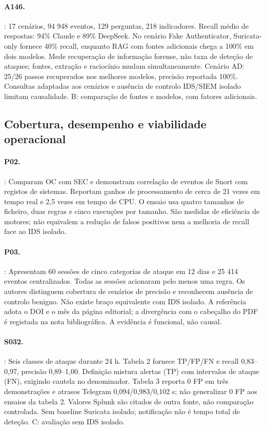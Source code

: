 \documentclass[11pt,a4paper]{article}
\begin{document}
\paragraph{A146.} \citet{ragincident2026}: 17 cenários, 94 948 eventos, 129 perguntas, 218 indicadores. Recall médio de respostas: 94\% Claude e 89\% DeepSeek. No cenário Fake Authenticator, Suricata-only fornece 40\% recall, enquanto RAG com fontes adicionais chega a 100\% em dois modelos. Mede recuperação de informação forense, não taxa de deteção de ataques; fontes, extração e raciocínio mudam simultaneamente. Cenário AD: 25/26 passos recuperados nos melhores modelos, precisão reportada 100\%. Consultas adaptadas aos cenários e ausência de controlo IDS/SIEM isolado limitam causalidade. B: comparação de fontes e modelos, com fatores adicionais.

\subsection{Cobertura, desempenho e viabilidade operacional}
\paragraph{P02.} \citet{sheeraz2024}: Comparam OC com SEC e demonstram correlação de eventos de Snort com registos de sistemas. Reportam ganhos de processamento de cerca de 21 vezes em tempo real e 2,5 vezes em tempo de CPU. O ensaio usa quatro tamanhos de ficheiro, duas regras e cinco execuções por tamanho. São medidas de eficiência de motores; não equivalem a redução de falsos positivos nem a melhoria de recall face ao IDS isolado.

\paragraph{P03.} \citet{suryayusra2026}: Apresentam 60 sessões de cinco categorias de ataque em 12 dias e 25 414 eventos centralizados. Todas as sessões acionaram pelo menos uma regra. Os autores distinguem cobertura de cenários de precisão e reconhecem ausência de controlo benigno. Não existe braço equivalente com IDS isolado. A referência adota o DOI e o mês da página editorial; a divergência com o cabeçalho do PDF é registada na nota bibliográfica. A evidência é funcional, não causal.

\paragraph{S032.} \citet{wazuhtelegram2026}: Seis classes de ataque durante 24 h. Tabela 2 fornece TP/FP/FN e recall 0,83--0,97, precisão 0,89--1,00. Definição mistura alertas (TP) com intervalos de ataque (FN), exigindo cautela no denominador. Tabela 3 reporta 0 FP em três demonstrações e atrasos Telegram 0,094/0,983/0,102 s; não generalizar 0 FP aos ensaios da tabela 2. Valores Splunk são citados de outra fonte, não comparação controlada. Sem baseline Suricata isolado; notificação não é tempo total de deteção. C: avaliação sem IDS isolado.
\end{document}
